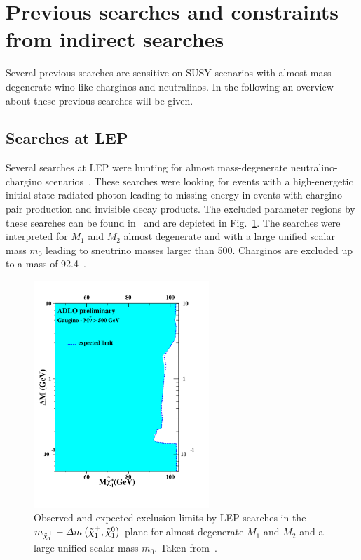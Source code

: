 \section{Previous searches and constraints from indirect searches}

Several previous searches are sensitive on SUSY scenarios with almost mass-degenerate wino-like charginos and neutralinos.
In the following an overview about these previous searches will be given.

\subsection*{Searches at LEP}
Several searches at LEP were hunting for almost mass-degenerate neutralino-chargino scenarios~\cite{bib:PreviousSearches_ALEPH,bib:PreviousSearches_OPAL,bib:PreviousSearches_DELPHI_2003,bib:PreviousSearches_DELPHI}.
These searches were looking for events with a high-energetic initial state radiated photon leading to missing energy in events with chargino-pair production and invisible decay products.
The excluded parameter regions by these searches can be found in~\cite{bib:LEP:SUSY_results} and are depicted in Fig.~\ref{fig:LEP}.
The searches were interpreted for $M_1$ and $M_2$ almost degenerate and with a large unified scalar mass $m_0$ leading to sneutrino masses larger than 500\gev. 
Charginos are excluded up to a mass of 92.4\gev~\cite{bib:LEP:SUSY_results}.
\begin{figure}[!h]
  \centering
      \includegraphics[width=0.59\textwidth]{figures/theory/mass_adlo_gaug_1.pdf}
  \caption{Observed and expected exclusion limits by LEP searches in the $m_{\tilde{\chi}^{\pm}_{1}}-\Delta m \left( \tilde{\chi}^{\pm}_{1}, \tilde{\chi}^{0}_{1} \right)$ plane for almost degenerate $M_1$ and $M_2$ and a large unified scalar mass $m_0$. Taken from~\cite{bib:LEP:SUSY_results}.}  
  \label{fig:LEP}
\end{figure}

